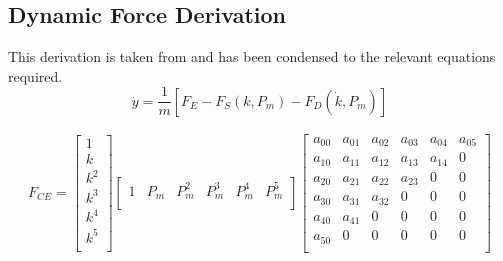 \documentclass[11pt,a4paper]{article}
\begin{document}
\begin{appendices}


\section{Dynamic Force Derivation}
This derivation is taken from \cite{hosovsky_2012} and has been condensed to the relevant equations required. \newline
\begin{equation}
    \ddot{y} = \frac{1}{m}[F_E-F_S(k,P_m)-F_D(\dot{k},P_m)]
\end{equation}

\begin{gather}
 F_{CE} =
 \begin{bmatrix}
    1 \\ 
    k \\
    k^2 \\
    k^3 \\
    k^4 \\
    k^5 \\
   \end{bmatrix}
 \begin{bmatrix}
    1 & P_m & P_m^2 & P_m^3 & P_m^4 & P_m^5 \\
   \end{bmatrix}
  \begin{bmatrix}
    a_{00} & a_{01} & a_{02} & a_{03} & a_{04} & a_{05} \\
    a_{10} & a_{11} & a_{12} & a_{13} & a_{14} & 0 \\
    a_{20} & a_{21} & a_{22} & a_{23} & 0      & 0 \\
    a_{30} & a_{31} & a_{32} & 0      & 0      & 0 \\
    a_{40} & a_{41} & 0      & 0      & 0      & 0 \\
    a_{50} & 0      & 0      & 0      & 0      & 0 \\
   \end{bmatrix}
\end{gather}


\end{appendices}
\end{document}
